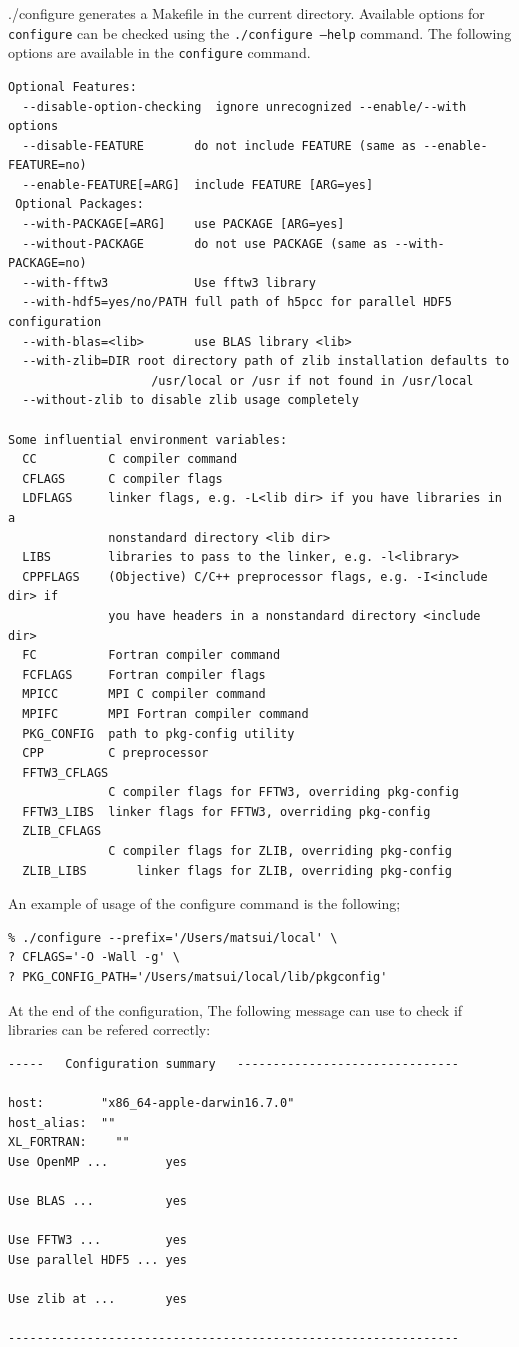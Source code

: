 {./configure} generates a Makefile in the current directory.  Available options for {\tt configure} can be checked using the {\tt ./configure --help} command. The following options are available in the {\tt configure} command.
%
{\small
\begin{verbatim}
Optional Features:
  --disable-option-checking  ignore unrecognized --enable/--with options
  --disable-FEATURE       do not include FEATURE (same as --enable-FEATURE=no)
  --enable-FEATURE[=ARG]  include FEATURE [ARG=yes]
 Optional Packages:
  --with-PACKAGE[=ARG]    use PACKAGE [ARG=yes]
  --without-PACKAGE       do not use PACKAGE (same as --with-PACKAGE=no)
  --with-fftw3            Use fftw3 library
  --with-hdf5=yes/no/PATH full path of h5pcc for parallel HDF5 configuration
  --with-blas=<lib>       use BLAS library <lib>
  --with-zlib=DIR root directory path of zlib installation defaults to
                    /usr/local or /usr if not found in /usr/local
  --without-zlib to disable zlib usage completely

Some influential environment variables:
  CC          C compiler command
  CFLAGS      C compiler flags
  LDFLAGS     linker flags, e.g. -L<lib dir> if you have libraries in a
              nonstandard directory <lib dir>
  LIBS        libraries to pass to the linker, e.g. -l<library>
  CPPFLAGS    (Objective) C/C++ preprocessor flags, e.g. -I<include dir> if
              you have headers in a nonstandard directory <include dir>
  FC          Fortran compiler command
  FCFLAGS     Fortran compiler flags
  MPICC       MPI C compiler command
  MPIFC       MPI Fortran compiler command
  PKG_CONFIG  path to pkg-config utility
  CPP         C preprocessor
  FFTW3_CFLAGS
              C compiler flags for FFTW3, overriding pkg-config
  FFTW3_LIBS  linker flags for FFTW3, overriding pkg-config
  ZLIB_CFLAGS
              C compiler flags for ZLIB, overriding pkg-config
  ZLIB_LIBS       linker flags for ZLIB, overriding pkg-config

\end{verbatim}
}
%
An example of usage of the configure command is the following;
\begin{verbatim}
% ./configure --prefix='/Users/matsui/local' \
? CFLAGS='-O -Wall -g' \
? PKG_CONFIG_PATH='/Users/matsui/local/lib/pkgconfig'
\end{verbatim}

At the end of the configuration, The following message can use to check if libraries can be refered correctly:

{\small
\begin{verbatim}
-----   Configuration summary   -------------------------------

host:        "x86_64-apple-darwin16.7.0"
host_alias:  ""
XL_FORTRAN:    ""
Use OpenMP ...        yes

Use BLAS ...          yes

Use FFTW3 ...         yes
Use parallel HDF5 ... yes

Use zlib at ...       yes

---------------------------------------------------------------
\end{verbatim}
}


